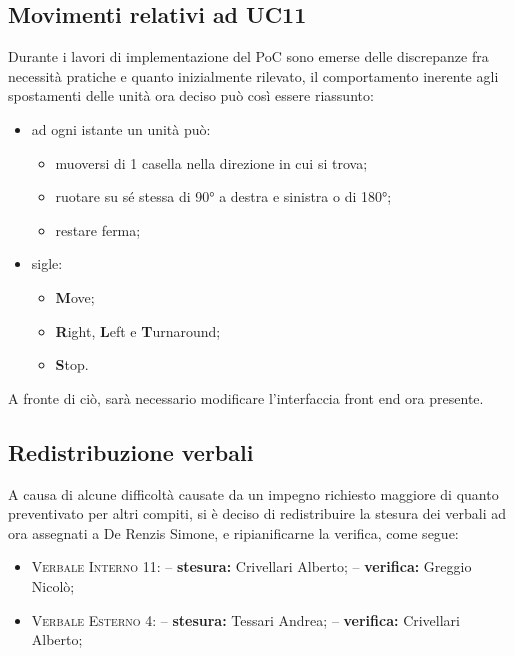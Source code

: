 \subsection{Movimenti relativi ad UC11}
\label{moves}
    Durante i lavori di implementazione del PoC sono emerse delle discrepanze fra necessità pratiche e quanto inizialmente rilevato, il comportamento inerente agli spostamenti delle unità ora deciso può così essere riassunto:
    \begin{itemize}
        \item ad ogni istante un unità può:
        \begin{itemize}
            \item muoversi di 1 casella nella direzione in cui si trova;
            \item ruotare su sé stessa di 90° a destra e sinistra o di 180°;
            \item restare ferma;
        \end{itemize}
        \item sigle:
        \begin{itemize}
            \item \textbf{M}ove;
            \item \textbf{R}ight, \textbf{L}eft e \textbf{T}urnaround;
            \item \textbf{S}top.
        \end{itemize}
    \end{itemize}
    A fronte di ciò, sarà necessario modificare l'interfaccia front end ora presente.

\subsection{Redistribuzione verbali}
    A causa di alcune difficoltà causate da un impegno richiesto maggiore di quanto preventivato per altri compiti, si è deciso di redistribuire la stesura dei verbali ad ora assegnati a De Renzis Simone, e ripianificarne la verifica, come segue:
    \begin{itemize}
        \item \textsc{Verbale Interno 11}:
            \subitem -- \textbf{stesura: }Crivellari Alberto;
            \subitem -- \textbf{verifica: }Greggio Nicolò;
        \item \textsc{Verbale Esterno 4}:
            \subitem -- \textbf{stesura: }Tessari Andrea;
            \subitem -- \textbf{verifica: }Crivellari Alberto;
    \end{itemize}

